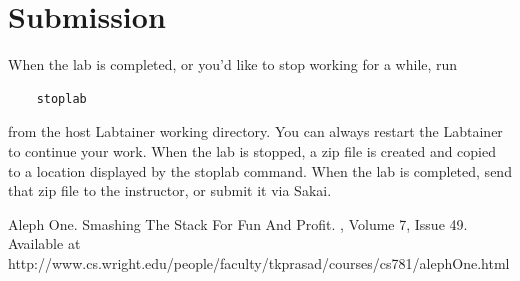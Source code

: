\section{Submission}
When the lab is completed, or you'd like to stop working for a while, run
\begin{verbatim}
    stoplab 
\end{verbatim}

\noindent from the host Labtainer working directory.  You can always restart the
Labtainer to continue your work.  When the lab is stopped, a
zip file is created and copied to a location displayed by the stoplab
command.  When the lab is completed, send that zip file to the instructor,
or submit it via Sakai.


\begin{thebibliography}{10}

Aleph One.
\newblock Smashing The Stack For Fun And Profit.
, Volume 7, Issue 49. Available at
         http://www.cs.wright.edu/people/faculty/tkprasad/courses/cs781/alephOne.html
\end{thebibliography}



